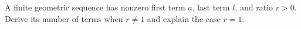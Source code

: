 A finite geometric sequence has nonzero first term $a$, last term $l$, and ratio $r>0$. Derive its number of terms when $r\ne1$ and explain the case $r=1$.
